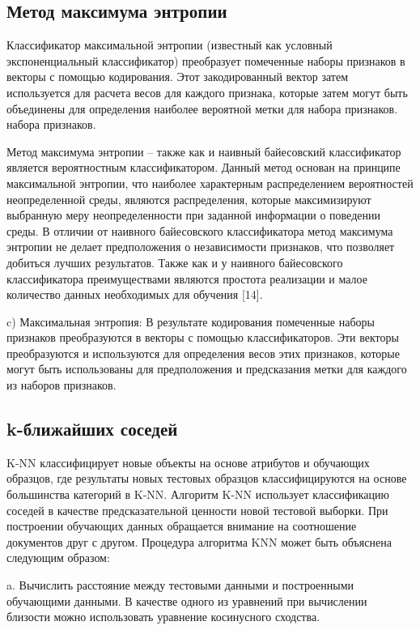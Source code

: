 \subsection{Метод максимума энтропии}

Классификатор максимальной энтропии (известный как условный экспоненциальный
классификатор) преобразует помеченные наборы признаков в векторы с помощью
кодирования. Этот закодированный вектор затем используется для расчета весов для
каждого признака, которые затем могут быть объединены для определения наиболее
вероятной метки для набора признаков. набора признаков. \cite{article4}

Метод максимума энтропии – также как и наивный байесовский классификатор
является вероятностным классификатором. Данный метод основан на принципе
максимальной энтропии, что наиболее характерным распределением вероятностей
неопределенной среды, являются распределения, которые максимизируют выбранную
меру неопределенности при заданной информации о поведении среды. В отличии от
наивного байесовского классификатора метод максимума энтропии не делает
предположения о независимости признаков, что позволяет добиться лучших
результатов. Также как и у наивного байесовского классификатора преимуществами
являются простота реализации и малое количество данных необходимых для обучения
[14]. \cite{article9}

c) Максимальная энтропия: В результате кодирования помеченные наборы признаков
преобразуются в векторы с помощью классификаторов. Эти векторы преобразуются и
используются для определения весов этих признаков, которые могут быть
использованы для предположения и предсказания метки для каждого из наборов
признаков. \cite{article18}

\subsection{k-ближайших соседей}

K-NN классифицирует новые объекты на основе атрибутов и обучающих образцов, где
результаты новых тестовых образцов классифицируются на основе большинства
категорий в K-NN. Алгоритм K-NN использует классификацию соседей в качестве
предсказательной ценности новой тестовой выборки.  При построении обучающих
данных обращается внимание на соотношение документов друг с другом.  Процедура
алгоритма KNN может быть объяснена следующим образом:

a. Вычислить расстояние между тестовыми данными и построенными обучающими
данными.  В качестве одного из уравнений при вычислении близости можно
использовать уравнение косинусного сходства.

